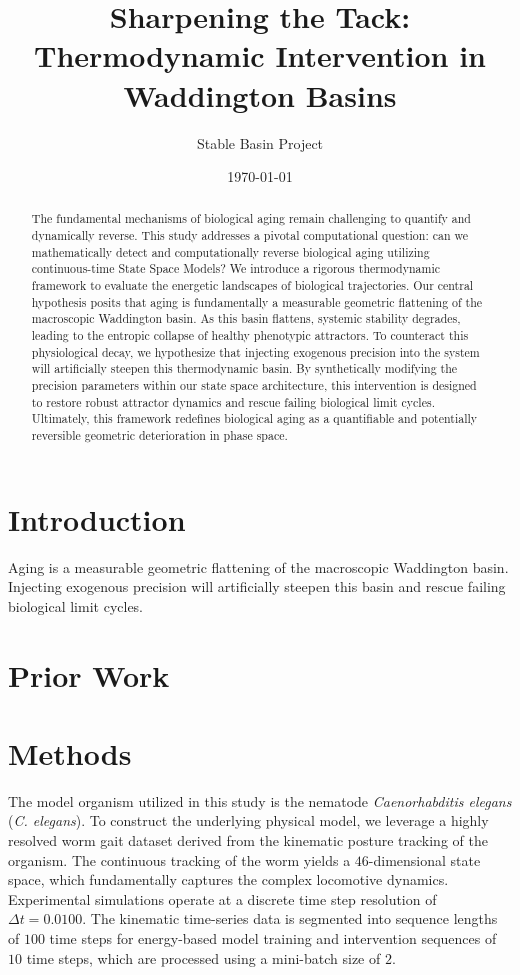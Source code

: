 \documentclass{article}
\title{Sharpening the Tack: Thermodynamic Intervention in Waddington Basins}
\author{Stable Basin Project}
\date{\today}
\begin{document}
\maketitle

\begin{abstract}
The fundamental mechanisms of biological aging remain challenging to quantify and dynamically reverse. This study addresses a pivotal computational question: can we mathematically detect and computationally reverse biological aging utilizing continuous-time State Space Models? We introduce a rigorous thermodynamic framework to evaluate the energetic landscapes of biological trajectories. Our central hypothesis posits that aging is fundamentally a measurable geometric flattening of the macroscopic Waddington basin. As this basin flattens, systemic stability degrades, leading to the entropic collapse of healthy phenotypic attractors. To counteract this physiological decay, we hypothesize that injecting exogenous precision into the system will artificially steepen this thermodynamic basin. By synthetically modifying the precision parameters within our state space architecture, this intervention is designed to restore robust attractor dynamics and rescue failing biological limit cycles. Ultimately, this framework redefines biological aging as a quantifiable and potentially reversible geometric deterioration in phase space.
\end{abstract}

\section{Introduction}
Aging is a measurable geometric flattening of the macroscopic Waddington basin. Injecting exogenous precision will artificially steepen this basin and rescue failing biological limit cycles.

\section{Prior Work}

\section{Methods}
The model organism utilized in this study is the nematode \textit{Caenorhabditis elegans} (\textit{C. elegans}). To construct the underlying physical model, we leverage a highly resolved worm gait dataset derived from the kinematic posture tracking of the organism. The continuous tracking of the worm yields a $46$-dimensional state space, which fundamentally captures the complex locomotive dynamics. Experimental simulations operate at a discrete time step resolution of $\Delta t = 0.0100$. The kinematic time-series data is segmented into sequence lengths of $100$ time steps for energy-based model training and intervention sequences of $10$ time steps, which are processed using a mini-batch size of $2$.
\end{document}
